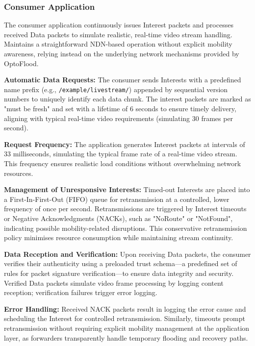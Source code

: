 \documentclass[conference]{IEEEtran}
\begin{document}
\subsubsection{Consumer Application}

The consumer application continuously issues Interest packets and processes received Data packets to simulate realistic, real-time video stream handling. Maintains a straightforward NDN-based operation without explicit mobility awareness, relying instead on the underlying network mechanisms provided by OptoFlood.

\textbf{Automatic Data Requests:}
The consumer sends Interests with a predefined name prefix (e.g., \texttt{/example/livestream/}) appended by sequential version numbers to uniquely identify each data chunk. The interest packets are marked as "must be fresh" and set with a lifetime of 6 seconds to ensure timely delivery, aligning with typical real-time video requirements (simulating 30 frames per second).

\textbf{Request Frequency:}
The application generates Interest packets at intervals of 33 milliseconds, simulating the typical frame rate of a real-time video stream. This frequency ensures realistic load conditions without overwhelming network resources.

\textbf{Management of Unresponsive Interests:}
Timed-out Interests are placed into a First-In-First-Out (FIFO) queue for retransmission at a controlled, lower frequency of once per second. Retransmissions are triggered by Interest timeouts or Negative Acknowledgments (NACKs), such as "NoRoute" or "NotFound", indicating possible mobility-related disruptions. This conservative retransmission policy minimises resource consumption while maintaining stream continuity.

\textbf{Data Reception and Verification:}
Upon receiving Data packets, the consumer verifies their authenticity using a preloaded trust schema—a predefined set of rules for packet signature verification—to ensure data integrity and security. Verified Data packets simulate video frame processing by logging content reception; verification failures trigger error logging.

\textbf{Error Handling:}
Received NACK packets result in logging the error cause and scheduling the Interest for controlled retransmission. Similarly, timeouts prompt retransmission without requiring explicit mobility management at the application layer, as forwarders transparently handle temporary flooding and recovery paths.
\end{document}
